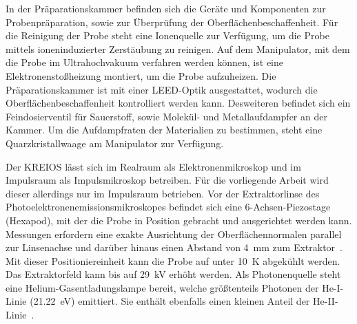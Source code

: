         In der Präparationskammer befinden sich die Geräte und Komponenten zur Probenpräparation, sowie zur Überprüfung der Oberflächenbeschaffenheit.
        Für die Reinigung der Probe steht eine Ionenquelle zur Verfügung, um die Probe mittels ioneninduzierter Zerstäubung zu reinigen.
        Auf dem Manipulator, mit dem die Probe im Ultrahochvakuum verfahren werden können, ist eine Elektronenstoßheizung montiert, um die Probe aufzuheizen.
        Die Präparationskammer ist mit einer LEED-Optik ausgestattet, wodurch die Oberflächenbeschaffenheit kontrolliert werden kann.
        Desweiteren befindet sich ein Feindosierventil für Sauerstoff, sowie Molekül- und Metallaufdampfer an der Kammer.
        Um die Aufdampfraten der Materialien zu bestimmen, steht eine Quarzkristallwaage am Manipulator zur Verfügung.

        Der KREIOS lässt sich im Realraum als Elektronenmikroskop und im Impulsraum als Impulsmikroskop betreiben.
        Für die vorliegende Arbeit wird dieser allerdings nur im Impulsraum betrieben.
        Vor der Extraktorlinse des Photoelektronenemissionsmikroskopes befindet sich eine 6-Achsen-Piezostage (Hexapod), mit der die Probe in Position gebracht und ausgerichtet werden kann.
        Messungen erfordern eine exakte Ausrichtung der Oberflächennormalen parallel zur Linsenachse und darüber hinaus einen Abstand von \SI{4}{\milli\meter} zum Extraktor~\cite{SPECS-MM}.
        Mit dieser Positioniereinheit kann die Probe auf unter \SI{10}{\kelvin} abgekühlt werden.
        Das Extraktorfeld kann bis auf \SI{29}{\kilo\volt} erhöht werden.
        Als Photonenquelle steht eine Helium-Gasentladungslampe bereit, welche größtenteils Photonen der He-I-Linie (\SI{21.22}{\electronvolt}) emittiert.
        Sie enthält ebenfalls einen kleinen Anteil der He-II-Linie~\cite{UVS}.
